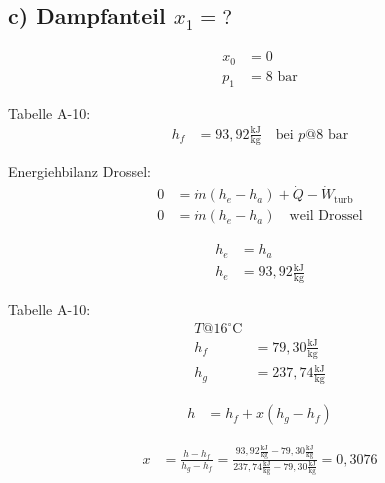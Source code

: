 \subsection*{c) Dampfanteil $x_1 = ?$}

\begin{align*}
x_0 &= 0 \\
p_1 &= 8 \text{ bar}
\end{align*}

Tabelle A-10:
\begin{align*}
h_f &= 93{,}92 \frac{\text{kJ}}{\text{kg}} \quad \text{bei } p @ 8 \text{ bar}
\end{align*}

Energiehbilanz Drossel:
\begin{align*}
0 &= \dot{m} (h_e - h_a) + \dot{Q} - \dot{W}_{\text{turb}} \\
0 &= \dot{m} (h_e - h_a) \quad \text{weil Drossel}
\end{align*}

\begin{align*}
h_e &= h_a \\
h_e &= 93{,}92 \frac{\text{kJ}}{\text{kg}}
\end{align*}

Tabelle A-10:
\begin{align*}
T @ 16^\circ \text{C} \\
h_f &= 79{,}30 \frac{\text{kJ}}{\text{kg}} \\
h_g &= 237{,}74 \frac{\text{kJ}}{\text{kg}}
\end{align*}

\begin{align*}
h &= h_f + x (h_g - h_f)
\end{align*}

\begin{align*}
x &= \frac{h - h_f}{h_g - h_f} = \frac{93{,}92 \frac{\text{kJ}}{\text{kg}} - 79{,}30 \frac{\text{kJ}}{\text{kg}}}{237{,}74 \frac{\text{kJ}}{\text{kg}} - 79{,}30 \frac{\text{kJ}}{\text{kg}}} = 0{,}3076
\end{align*}
